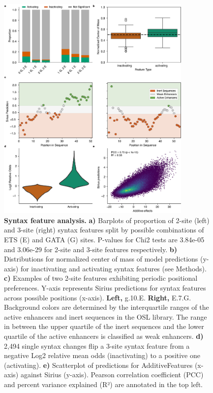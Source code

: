\begin{figure}[p]
    \centering
    \includegraphics[width=0.85\textwidth]{2_figures-and-files/SuppFig9.png}
    \caption[Syntax feature analysis.]{\textbf{Syntax feature analysis.} \textbf{a)} Barplots of proportion of 2-site (left) and 3-site (right) syntax features split by possible combinations of ETS (E) and GATA (G) sites. P-values for Chi2 tests are 3.84e-05 and 3.06e-29 for 2-site and 3-site features respectively. \textbf{b)} Distributions for normalized center of mass of model predictions (y-axis) for inactivating and activating syntax features (see Methods). \textbf{c)} Examples of two 2-site features exhibiting periodic positional preferences. Y-axis represents Sirius predictions for syntax features across possible positions (x-axis). \textbf{Left,} g.10.E. \textbf{Right,} E.7.G. Background colors are determined by the interquartile ranges of the active enhancers and inert sequences in the OSL library. The range in between the upper quartile of the inert sequences and the lower quartile of the active enhancers is classified as weak enhancers. \textbf{d)} 2,494 single syntax changes flip a 3-site syntax feature from a negative Log2 relative mean odds (inactivating) to a positive one (activating). \textbf{e)} Scatterplot of predictions for AdditiveFeatures (x-axis) against Sirius (y-axis). Pearson correlation coefficient (PCC) and percent variance explained (R²) are annotated in the top left.}
    \label{fig:supplementary_9}
\end{figure}

